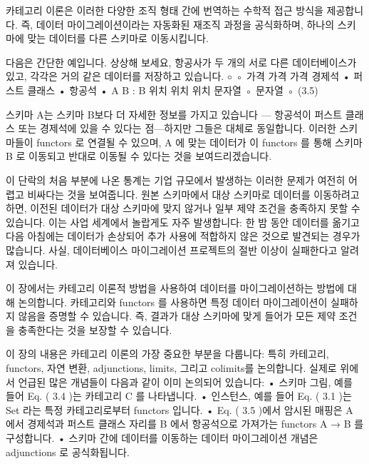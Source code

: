\documentclass[11pt, a4paper, twoside, openany]{book}
\begin{document}
{\par\medskip
카테고리 이론은 이러한 다양한 조직 형태 간에 번역하는 수학적 접근 방식을 제공합니다. 즉, 데이터 마이그레이션이라는 자동화된 재조직 과정을 공식화하며, 하나의 스키마에 맞는 데이터를 다른 스키마로 이동시킵니다.

\par\medskip
다음은 간단한 예입니다. 상상해 보세요, 항공사가 두 개의 서로 다른 데이터베이스가 있고, 각각은 거의 같은 데이터를 저장하고 있습니다. 
$ ◦
$ ◦
가격
가격
가격
경제석
•
퍼스트 클래스
•
항공석
•
A B
 : B
위치
위치
위치
문자열
◦
문자열
◦
(3.5)

\par\medskip
스키마 A\hspace{0pt}는 스키마 B\hspace{0pt}보다 더 자세한 정보를 가지고 있습니다 — 항공석이 퍼스트 클래스 또는 경제석에 있을 수 있다는 점—하지만 그들은 대체로 동일합니다. 이러한 스키마들이 functors 로 연결될 수 있으며, A 에 맞는 데이터가 이 functors 를 통해 스키마 B 로 이동되고 반대로 이동될 수 있다는 것을 보여드리겠습니다.

\par\medskip
이 단락의 처음 부분에 나온 통계는 기업 규모에서 발생하는 이러한 문제가 여전히 어렵고 비싸다는 것을 보여줍니다. 원본 스키마에서 대상 스키마로 데이터를 이동하려고 하면, 이전된 데이터가 대상 스키마에 맞지 않거나 일부 제약 조건을 충족하지 못할 수 있습니다. 이는 사업 세계에서 놀랍게도 자주 발생합니다: 한 밤 동안 데이터를 옮기고 다음 아침에는 데이터가 손상되어 추가 사용에 적합하지 않은 것으로 발견되는 경우가 많습니다. 사실, 데이터베이스 마이그레이션 프로젝트의 절반 이상이 실패한다고 알려져 있습니다.

\par\medskip
이 장에서는 카테고리 이론적 방법을 사용하여 데이터를 마이그레이션하는 방법에 대해 논의합니다. 카테고리와 functors 를 사용하면 특정 데이터 마이그레이션이 실패하지 않음을 증명할 수 있습니다. 즉, 결과가 대상 스키마에 맞게 들어가 모든 제약 조건을 충족한다는 것을 보장할 수 있습니다.

\par\medskip
이 장의 내용은 카테고리 이론의 가장 중요한 부분을 다룹니다: 특히 카테고리, functors, 자연 변환, adjunctions, limits, 그리고 colimits\hspace{0pt}를 논의합니다. 실제로 위에서 언급된 많은 개념들이 다음과 같이 이미 논의되어 있습니다:
• 스키마 그림, 예를 들어 Eq. ( 3.4 )는 카테고리 C 를 나타냅니다.
• 인스턴스, 예를 들어 Eq. ( 3.1 )는 Set 라는 특정 카테고리로부터 functors 입니다.
• Eq. ( 3.5 )에서 암시된 매핑은 A 에서 경제석과 퍼스트 클래스 자리를 B 에서 항공석으로 가져가는 functors A → B 를 구성합니다.
• 스키마 간에 데이터를 이동하는 데이터 마이그레이션 개념은 adjunctions 로 공식화됩니다.

}
\end{document}
